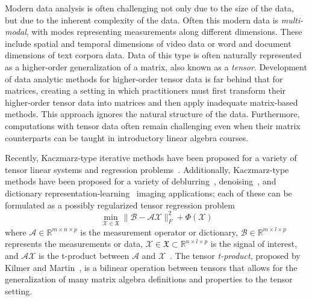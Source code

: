 \documentclass[10.5pt]{amsart}
\newcommand{\tens}[1]{\bm{\mathcal{#1}}}
\def\tA{{\tens{A}}}  %
\def\tB{{\tens{B}}}  %
\def\tX{{\tens{X}}}  %
\begin{document}
Modern data analysis is often challenging not only due to the size of the data, but due to the inherent complexity of the data. 
Often this modern data is \emph{multi-modal}, with modes representing measurements along different dimensions.
These include spatial and temporal dimensions of video data or word and document dimensions of text corpora data.  
Data of this type is often naturally represented as a higher-order generalization of a matrix, also known as a \emph{tensor}. 
Development of data analytic methods for higher-order tensor data is far behind that for matrices, creating a setting in which practitioners must first transform their higher-order tensor data into matrices and then apply inadequate matrix-based methods.
This approach ignores the natural structure of the data.  Furthermore, computations with tensor data often remain challenging even when their matrix counterparts can be taught in introductory linear algebra courses. 

Recently, Kaczmarz-type iterative methods have been proposed for a variety of tensor linear systems and regression problems~\cite{ma2022randomized,chen2021regularized,tang2023sketch}.  Additionally, Kaczmarz-type methods have been proposed for a variety of deblurring~\cite{kilmer2013third}, denoising~\cite{mallat1999wavelet}, and dictionary representation-learning~\cite{newman2020nonnegative} imaging applications; each of these can be formulated as a possibly regularized tensor regression problem 
\begin{equation}
    \min_{\tX \in \mathfrak{X}} \|\tB - \tA \tX\|_F^2 + \Phi(\tX)
\end{equation}
\vspace{-0.1em}where $\tA \in \mathbb{R}^{m \times n \times p}$ is the measurement operator or dictionary, $\tB \in \mathbb{R}^{m \times l \times p}$ represents the measurements or data, $\tX \in \mathfrak{X} \subset \mathbb{R}^{n \times l \times p}$ is the signal of interest, and $\tA \tX$ is the t-product between $\tA$ and $\tX$~\cite{kilmer2011factorization}. 
The tensor \emph{t-product}, proposed by Kilmer and Martin~\cite{kilmer2013third}, is a bilinear operation between tensors that allows for the generalization of many matrix algebra definitions and properties to the tensor setting.
 
\end{document}
